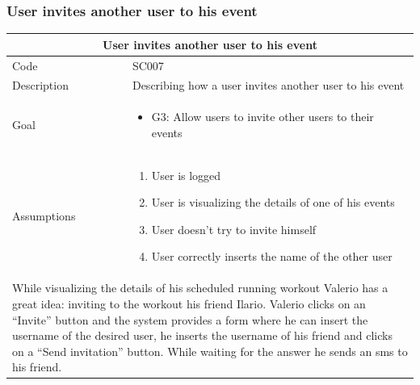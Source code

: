 \documentclass[10pt,a4paper,titlepage]{article}
\begin{document}
\subsubsection{User invites another user to his event}
\begin{tabular}{| p{3cm} | p{10cm} |}
\hline \multicolumn{2}{|c|}{\textbf{User invites another user to his event}} \\ 
\hline Code & SC007 \\ 
\hline Description & Describing how a user invites another user to his event \\
\hline Goal & \begin{itemize}\item G3: Allow users to invite other users to their events \end{itemize}\\
\hline Assumptions & \begin{enumerate}
\item User is logged
\item User is visualizing the details of one of his events
\item User doesn't try to invite himself
\item User correctly inserts the name of the other user
\end{enumerate} \\
\hline \multicolumn{2}{|p{13cm}|}{While visualizing the details of his scheduled running workout Valerio has a great idea: inviting to the workout his friend Ilario. Valerio clicks on an “Invite” button and the system provides a form where he can insert the username of the desired user, he inserts the username of his friend and clicks on a “Send invitation” button. While waiting for the answer he sends an sms to his friend.}\\
\hline
\end{tabular}
\end{document}
